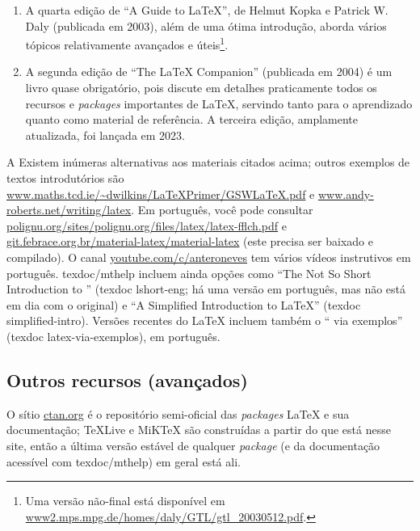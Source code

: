 \begin{enumerate}

  \item A quarta edição de ``A Guide to \LaTeX'', de Helmut Kopka
        e Patrick W. Daly (publicada em 2003), além de uma ótima
        introdução, aborda vários tópicos relativamente avançados
        e úteis\footnote{Uma versão não-final está disponível em
        \url{www2.mps.mpg.de/homes/daly/GTL/gtl_20030512.pdf}.}.
  \item A segunda edição de ``The \LaTeX{} Companion'' (publicada em
        2004) é um livro quase obrigatório, pois discute em detalhes
        praticamente todos os recursos e \textit{packages} importantes
        de \LaTeX{}, servindo tanto para o aprendizado quanto como
        material de referência. A terceira edição, amplamente atualizada,
        foi lançada em 2023.

\end{enumerate}

\froufrou
A
Existem inúmeras alternativas aos materiais citados acima; outros exemplos de
textos introdutórios são \url{www.maths.tcd.ie/~dwilkins/LaTeXPrimer/GSWLaTeX.pdf}
e \url{www.andy-roberts.net/writing/latex}. Em português, você pode
consultar \url{polignu.org/sites/polignu.org/files/latex/latex-fflch.pdf}
e \url{git.febrace.org.br/material-latex/material-latex} (este precisa ser
baixado e compilado). O canal \url{youtube.com/c/anteroneves} tem vários
vídeos instrutivos em português. \textsf{texdoc/mthelp} incluem ainda opções
como ``The Not So Short Introduction to \LaTeXe{}'' (\textsf{texdoc
lshort-eng}; há uma versão em português, mas não está em dia com o original)
e ``A Simplified Introduction to \LaTeX{}'' (\textsf{texdoc simplified-intro}).
Versões recentes do \LaTeX{} incluem também o ``\LaTeXe{} via exemplos''
(\textsf{texdoc latex-via-exemplos}), em português.

\subsection{Outros recursos (avançados)}

O sítio \url{ctan.org} é o repositório semi-oficial das
\textit{packages} \LaTeX{} e sua documentação; \TeX{}Live e MiK\TeX{} são
construídas a partir do que está nesse site, então a última versão estável de
qualquer \textit{package} (e da documentação acessível com \textsf{texdoc/mthelp})
em geral está ali.

